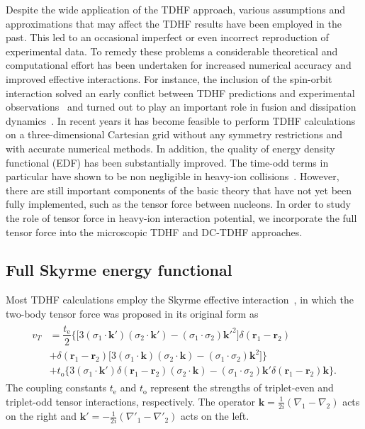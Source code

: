 \documentclass[aps,prc,twocolumn,showpacs,superscriptaddress,longbibliography,nofootinbib,floatfix,10pt]{revtex4-1}
\begin{document}
Despite the wide application of the TDHF approach, various assumptions and approximations that may affect the TDHF results have been employed in the past.
This led to an occasional imperfect or even incorrect reproduction of experimental data.
To remedy these problems a considerable theoretical and computational effort has been undertaken for increased numerical accuracy
and improved effective interactions.
For instance, the inclusion of the spin-orbit interaction solved an early conflict between TDHF predictions and experimental observations~\cite{Umar1986_PRL56-2793,Umar1989_PRC40-706} and turned out to play an important role in fusion and dissipation dynamics~\cite{Maruhn2006_PRC74-027601,Dai2014_PRC90-044609}. In recent years it has become feasible
to perform TDHF calculations on a three-dimensional Cartesian grid without any symmetry restrictions and with accurate numerical methods. In
addition, the quality of energy density functional (EDF) has been substantially improved. The time-odd
terms in particular have shown to be non negligible in heavy-ion collisions~\cite{Umar2006_PRC73-054607}. However, there are still important components of the basic theory that have not yet been fully implemented, such as the tensor force between nucleons. In order to study the role of tensor force
in heavy-ion interaction potential, we incorporate the full tensor force into the microscopic TDHF
and DC-TDHF approaches.

\subsection{Full Skyrme energy functional}

Most TDHF calculations employ the Skyrme effective interaction~\cite{Skyrme1956_PM1-1043}, in which the two-body tensor force was proposed in its original form as
\begin{align}
\begin{split}
v_T&=\dfrac{t_\mathrm{e}}{2}\bigg\{\big[3({\sigma}_\mathrm{1}\cdot\mathbf{k}')({\sigma}_\mathrm{2}\cdot\mathbf{k}')-({\sigma}_\mathrm{1}\cdot{\sigma}_\mathrm{2})\mathbf{k}'^{\mathrm{2}}\big]\delta(\mathbf{r}_\mathrm{1}-\mathbf{r}_\mathrm{2})\\
&+\delta(\mathbf{r}_\mathrm{1}-\mathbf{r}_\mathrm{2})\big[3({\sigma}_\mathrm{1}\cdot\mathbf{k})({\sigma}_\mathrm{2}\cdot\mathbf{k})-({\sigma}_\mathrm{1}\cdot{\sigma}_\mathrm{2})\mathbf{k}^\mathrm{2}\big]\bigg\}\\
&+t_\mathrm{o}\bigg\{3({\sigma}_\mathrm{1}\cdot\mathbf{k}')\delta(\mathbf{r}_\mathrm{1}-\mathbf{r}_\mathrm{2})({\sigma}_\mathrm{2}\cdot\mathbf{k})-({\sigma}_\mathrm{1}\cdot{\sigma}_\mathrm{2})\mathbf{k}'
\delta(\mathbf{r}_\mathrm{1}-\mathbf{r}_\mathrm{2})\mathbf{k}\bigg\}.
\end{split}
\end{align}
The coupling constants $t_\textrm{e}$ and $t_\textrm{o}$ represent the strengths of triplet-even and
triplet-odd tensor interactions, respectively.  The operator $\mathbf{k}=\frac{1}{2i}(\nabla_1-\nabla_2)$ acts on the right and
$\mathbf{k}'=-\frac{1}{2i}(\nabla'_1-\nabla'_2)$ acts on the left.
\end{document}
